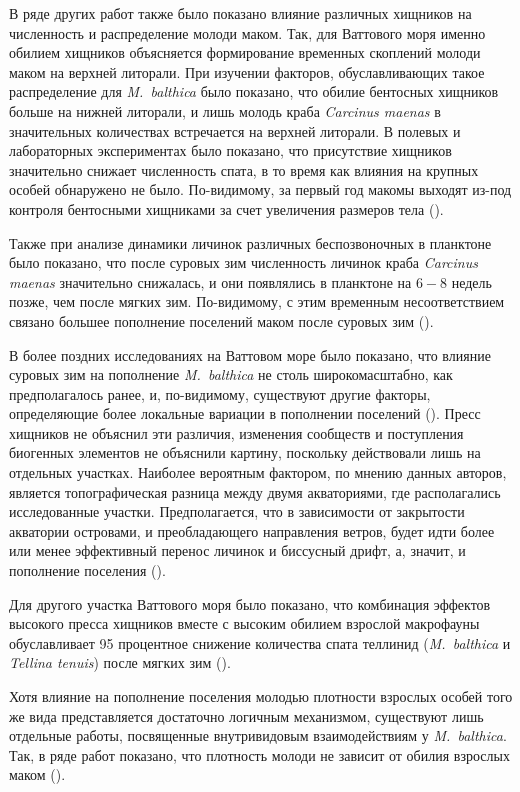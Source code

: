 В ряде других работ также было показано влияние различных хищников на численность и распределение молоди маком. 
Так, для Ваттового моря именно обилием хищников объясняется формирование временных скоплений молоди маком на верхней литорали. 
При изучении факторов, обуславливающих такое распределение для \textit{M.~balthica} было показано, что обилие бентосных хищников больше на нижней литорали, и лишь молодь краба \textit{Carcinus maenas} в значительных количествах встречается на верхней литорали. 
В полевых и лабораторных экспериментах было показано, что присутствие хищников значительно снижает численность спата, в то время как влияния на крупных особей обнаружено не было. 
По-видимому, за первый год макомы выходят из-под контроля бентосными хищниками за счет увеличения размеров тела (\cite{Hiddink_et_al_2002_predation_epifauna}). 

Также при анализе динамики личинок различных беспозвоночных в планктоне было показано, что после суровых зим численность личинок краба \textit{Carcinus maenas} значительно снижалась, и они появлялись в планктоне на $6-8$ недель позже, чем после мягких зим. 
По-видимому, с этим временным несоответствием связано большее пополнение поселений маком после суровых зим (\cite{Strasser_Gunter_2001}).

В более поздних исследованиях на Ваттовом море было показано, что влияние суровых зим на пополнение \textit{M.~balthica} не столь широкомасштабно, как предполагалось ранее, и, по-видимому, существуют другие факторы, определяющие более локальные вариации в пополнении поселений (\cite{Strasser_et_al_2003, Flatch_2003}).
Пресс хищников не объяснил эти различия, изменения сообществ и поступления биогенных элементов не объяснили картину, поскольку действовали лишь на отдельных участках. 
Наиболее вероятным фактором, по мнению данных авторов, является топографическая разница между двумя акваториями, где располагались исследованные участки. 
Предполагается, что в зависимости от закрытости акватории островами, и преобладающего направления ветров, будет идти более или менее эффективный перенос личинок и биссусный дрифт, а, значит, и пополнение поселения (\cite{Strasser_et_al_2003}).

Для другого участка Ваттового моря было показано, что комбинация эффектов высокого пресса хищников вместе с высоким обилием взрослой макрофауны обуславливает 95 процентное снижение количества спата теллинид (\textit{M.~balthica} и \textit{Tellina tenuis}) после мягких зим (\cite{Flatch_2003}). 

Хотя влияние на пополнение поселения молодью плотности взрослых особей того же вида представляется достаточно логичным механизмом, существуют лишь отдельные работы, посвященные внутривидовым взаимодействиям у \textit{M.~balthica}. 
Так, в ряде работ показано, что плотность молоди не зависит от обилия взрослых маком (\cite{Olafsson_1989, Vincent_et_al_1989, Beukema_et_al_2001, Richards_et_al_2002}). 

